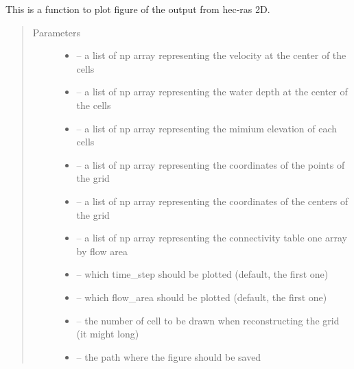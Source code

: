 \documentclass[letterpaper,10pt,english]{sphinxmanual}
\begin{document}
\begin{fulllineitems}
\label{\detokenize{index:src.hec_ras2D.figure_hec_ras2d}}
This is a function to plot figure of the output from hec-ras 2D.
\begin{quote}\begin{description}
\item[{Parameters}] \leavevmode\begin{itemize}
\item {} 
 -- a list of np array representing the velocity at the center of the cells

\item {} 
 -- a list of np array representing the water depth at the center of the cells

\item {} 
 -- a list of np array representing the mimium elevation of each cells

\item {} 
 -- a list of np array representing the coordinates of the points of the grid

\item {} 
 -- a list of np array representing the coordinates of the centers of the grid

\item {} 
 -- a list of np array representing the connectivity table
one array by flow area

\item {} 
 -- which time\_step should be plotted (default, the first one)

\item {} 
 -- which flow\_area should be plotted (default, the first one)

\item {} 
 -- the number of cell to be drawn when reconstructing the grid (it might long)

\item {} 
 -- the path where the figure should be saved


\end{itemize}
\end{description}
\end{quote}
\end{fulllineitems}
\end{document}

